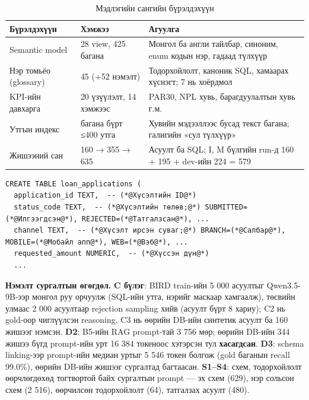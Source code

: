 \begin{table}[H]
\centering\small
\caption{Мэдлэгийн сангийн бүрэлдэхүүн}
\label{tab:knowledge}
\begin{tabularx}{\textwidth}{p{3.4cm}p{3.0cm}X}
\toprule
Бүрэлдэхүүн & Хэмжээ & Агуулга \\
\midrule
Semantic model & 28 view, 425 багана & Монгол ба англи тайлбар, синоним, enum кодын нэр, гадаад түлхүүр \\
Нэр томьёо (glossary) & 45 (+52 нэмэлт) & Тодорхойлолт, каноник SQL, хамаарах хүснэгт; 7 нь хоёрдмол \\
KPI-ийн давхарга & 20 үзүүлэлт, 14 хэмжээс & PAR30, NPL хувь, барагдуулалтын хувь г.м. \\
Утгын индекс & багана бүрт ≤400 утга & Хувийн мэдээллээс бусад текст багана; галигийн «сул түлхүүр» \\
Жишээний сан & 160 → 355 → 635 & Асуулт ба SQL; I, M бүлгийн run-д 160 + 195 + dev-ийн 224 = 579 \\
\bottomrule
\end{tabularx}
\end{table}

\begin{lstlisting}[language=SQLmn, basicstyle=\ttfamily\scriptsize, caption={Тайлбартай DDL-ийн хэсэг (prompt-д орох хэлбэр)}, label={lst:ddl}]
CREATE TABLE loan_applications (
  application_id TEXT,  -- (*@Хүсэлтийн ID@*)
  status_code TEXT,  -- (*@Хүсэлтийн төлөв;@*) SUBMITTED=(*@Илгээгдсэн@*), REJECTED=(*@Татгалзсан@*), ...
  channel TEXT,  -- (*@Хүсэлт ирсэн суваг;@*) BRANCH=(*@Салбар@*), MOBILE=(*@Мобайл апп@*), WEB=(*@Вэб@*), ...
  requested_amount NUMERIC,  -- (*@Хүссэн дүн@*)
  ...
\end{lstlisting}

\textbf{Нэмэлт сургалтын өгөгдөл.} \textbf{C бүлэг}: BIRD train-ийн 5 000 асуултыг Qwen3.5-9B-ээр монгол руу орчуулж (SQL-ийн
утга, нэрийг маскаар хамгаалж), төсвийн улмаас 2 000 асуултаар rejection sampling хийв (асуулт бүрт 8 хариу); C2 нь
gold-оор чиглүүлсэн reasoning, C3 нь өөрийн DB-ийн синтетик асуулт ба 160 жишээг нэмсэн. \textbf{D2}: B5-ийн RAG prompt-тай
3 756 мөр; өөрийн DB-ийн 344 жишээ бүгд prompt-ийн урт 16 384 токеноос хэтэрсэн тул \textbf{хасагдсан}. \textbf{D3}: schema
linking-ээр prompt-ийн медиан уртыг 5 546 токен болгож (gold баганын recall 99.0\%), өөрийн DB-ийн жишээг сургалтад
багтаасан. \textbf{S1--S4}: схем, тодорхойлолт өөрчлөгдөхөд тогтвортой байх сургалтын prompt --- эх схем (629), нэр сольсон
схем (2 516), өөрчилсөн тодорхойлолт (64), татгалзах асуулт (480).

